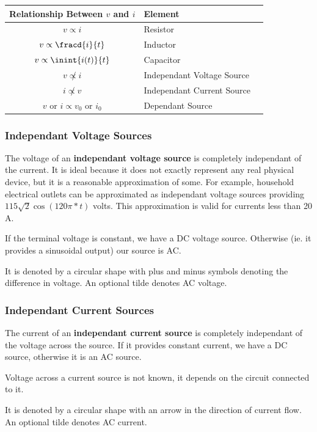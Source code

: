 \documentclass[12pt]{article}
\begin{document}
\begin{table}[ht]
\centering
  \begin{tabular}{clc}
  Relationship Between $v$ and $i$ & Element \\ \hline
  $v \propto i$ & Resistor \\
  $v \propto \fracd{i}{t}$ & Inductor \\
  $v \propto \inint{i(t)}{t}$ & Capacitor \\
  $v \not\propto i$ & Independant Voltage Source \\
  $i \not\propto v$ & Independant Current Source \\
  $v$ or $i \propto v_0$ or $i_0$ & Dependant Source \\ \hline
  \end{tabular}
\end{table}

\subsubsection*{Independant Voltage Sources}
The voltage of an {\bf independant voltage source} is completely independant of the current. It is ideal because it does not exactly represent any real physical device, but it is a reasonable approximation of some. For example, household electrical outlets can be approximated as independant voltage sources providing $115\sqrt{2}\cos(120\pi *t)$ volts. This approximation is valid for currents less than 20 A.

If the terminal voltage is constant, we have a DC voltage source. Otherwise (ie. it provides a sinusoidal output) our source is AC.

It is denoted by a circular shape with plus and minus symbols denoting the difference in voltage. An optional tilde denotes AC voltage.

\subsubsection*{Independant Current Sources}
The current of an {\bf independant current source} is completely independant of the voltage across the source. If it provides constant current, we have a DC source, otherwise it is an AC source.

Voltage across a current source is not known, it depends on the circuit connected to it.

It is denoted by a circular shape with an arrow in the direction of current flow. An optional tilde denotes AC current.
\end{document}
